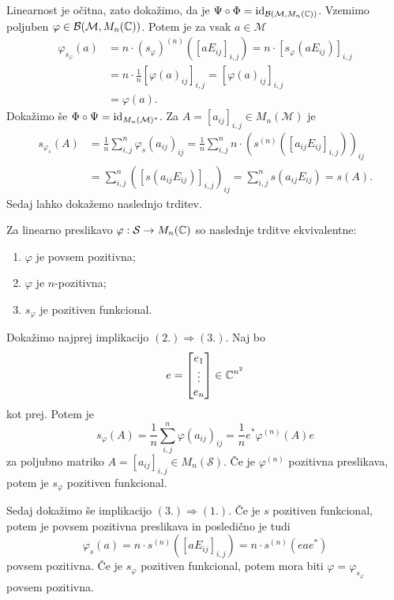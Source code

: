     Linearnost je očitna, zato dokažimo, da je $\Psi \circ \Phi = \operatorname{id}_{\mathcal{B} (\mathcal{M}, M_n (\mathbb C))}$.
    Vzemimo poljuben $\varphi \in \mathcal{B} (\mathcal{M}, M_n (\mathbb C))$. Potem je za vsak $a \in \mathcal{M}$
    \begin{align*}
        \varphi_{s_{\varphi}} (a) &= n \cdot (s_{\varphi}) ^{(n)} ([a E_{ij}]_{i, j}) = n \cdot [s_{\varphi}(a E_{ij})]_{i, j} \\
        &= n \cdot \frac{1}{n}[\varphi (a)_{ij} ]_{i, j} = [\varphi (a)_{ij} ]_{i, j}\\
        &= \varphi(a).
    \end{align*}
    Dokažimo še $\Phi \circ \Psi = \operatorname{id}_{M_n (\mathcal{M})^*}$. Za $A = [a_{ij}]_{i, j} \in M_n (\mathcal{M})$ je 
    \begin{align*}
        s_{\varphi_s} (A) &= \frac{1}{n} \sum_{i, j} ^n \varphi_s (a_{ij})_{ij} = \frac{1}{n} \sum_{i, j} ^n n \cdot (s^{(n)} ([a_{ij} E_{ij}]_{i, j}))_{ij}\\
        &= \sum_{i, j} ^n ([ s(a_{ij} E_{ij})]_{i, j})_{ij} = \sum_{i, j} ^n  s(a_{ij} E_{ij}) = s(A).
    \end{align*}
    Sedaj lahko dokažemo naslednjo trditev.

\begin{trditev}\label{trd:1.7}
    Za linearno preslikavo $\varphi: \mathcal{S} \to M_n (\mathbb C)$ so naslednje trditve ekvivalentne:
    \begin{enumerate}
        \item $\varphi$ je povsem pozitivna;
        \item $\varphi$ je $n$-pozitivna;
        \item $s_\varphi$ je pozitiven funkcional.
    \end{enumerate}
\end{trditev}

\begin{dokaz}
    Dokažimo najprej implikacijo $(2.) \Rightarrow (3.)$.
    Naj bo $$e = \begin{bmatrix}
        e_1 \\ \vdots \\ e_n
    \end{bmatrix} \in \mathbb C^{n^2}$$
    kot prej. Potem je $$s_{\varphi} (A) = \frac{1}{n} \sum_{i, j} ^n \varphi(a_{ij})_{ij} = \frac{1}{n} e^* \varphi^{(n)}(A) e$$
    za poljubno matriko $A = [a_{ij}]_{i, j} \in M_n (\mathcal{S})$.
    Če je $\varphi^{(n)}$ pozitivna preslikava, potem je $s_\varphi$ pozitiven funkcional.
    
    Sedaj dokažimo še implikacijo $(3.) \Rightarrow (1.)$.
    Če je $s$ pozitiven funkcional, potem je povsem pozitivna preslikava in posledično je tudi 
    $$\varphi_{s} (a) = n \cdot s^{(n)} ([aE_{ij}]_{i, j}) = n \cdot s^{(n)} (e a e^*)$$
    povsem pozitivna. Če je $s_\varphi$ pozitiven funkcional, potem mora biti $\varphi = \varphi_{s_\varphi}$ povsem pozitivna.
\end{dokaz}


